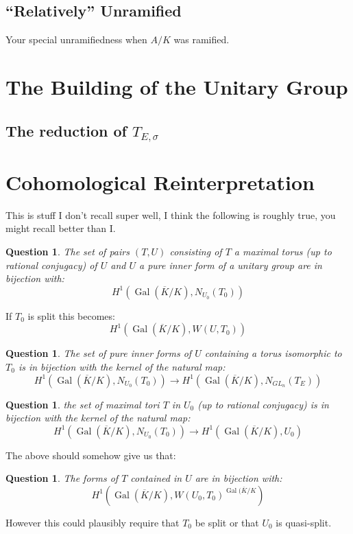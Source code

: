 \documentclass{article}
\theoremstyle{plain}
\newtheorem{question}[theorem]{Question}
\theoremstyle{definition}
\DeclareMathOperator{\Gal}{Gal}
\begin{document}
\subsection{``Relatively'' Unramified}

Your special unramifiedness when $A/K$ was ramified.

\section{The Building of the Unitary Group}

\subsection{The reduction of $T_{E,\sigma}$}

\section{Cohomological Reinterpretation}

This is stuff I don't recall super well, I think the following is roughly true, you might recall better than I.

\begin{question}
The set of pairs $(T,U)$ consisting of $T$ a maximal torus (up to rational conjugacy) of $U$ and $U$ a pure inner form of a unitary group are in bijection with:
\[ H^1( \Gal(\overline{K}/K), N_{U_0}(T_0) ) \]
\end{question}
If $T_0$ is split this becomes:
\[ H^1( \Gal(\overline{K}/K), W(U,T_0) ) \]

\begin{question}
The set of pure inner forms of $U$ containing a torus isomorphic to $T_0$ is in bijection with the kernel of the natural map:
\[ H^1( \Gal(\overline{K}/K), N_{U_0}(T_0) ) \rightarrow H^1( \Gal(\overline{K}/K),N_{GL_n}(T_E )) \]
\end{question}

\begin{question}
the set of maximal tori $T$ in $U_0$ (up to rational conjugacy) is in bijection with the kernel of the natural map:
\[  H^1( \Gal(\overline{K}/K), N_{U_0}(T_0) ) \rightarrow H^1( \Gal(\overline{K}/K), U_0) \]
\end{question}

The above should somehow give us that:
\begin{question}
The forms of $T$ contained in $U$ are in bijection with:
\[ H^1(\Gal(\overline{K}/K), W(U_0,T_0)^{\Gal(\overline{K}/K} ) \]
\end{question}
However this could plausibly require that $T_0$ be split or that $U_0$ is quasi-split.
\end{document}
